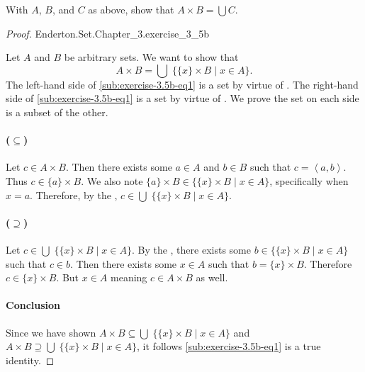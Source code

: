 \documentclass{report}
\begin{document}
With $A$, $B$, and $C$ as above, show that $A \times B = \bigcup C$.

\begin{proof}

    {Enderton.Set.Chapter\_3.exercise\_3\_5b}

  Let $A$ and $B$ be arbitrary sets.
  We want to show that
    \begin{equation}
      \label{sub:exercise-3.5b-eq1}
      A \times B = \bigcup\; \{\{x\} \times B \mid x \in A\}.
    \end{equation}
  The left-hand side of \eqref{sub:exercise-3.5b-eq1} is a set by virtue of
    .
  The right-hand side of \eqref{sub:exercise-3.5b-eq1} is a set by virtue of
    .
  We prove the set on each side is a subset of the other.

  \paragraph{($\subseteq$)}%

    Let $c \in A \times B$.
    Then there exists some $a \in A$ and $b \in B$ such that
      $c = \left< a, b \right>$.
    Thus $c \in \{a\} \times B$.
    We also note $\{a\} \times B \in \{\{x\} \times B \mid x \in A\}$,
      specifically when $x = a$.
    Therefore, by the ,
      $c \in \bigcup\;\{\{x\} \times B \mid x \in A\}$.

  \paragraph{($\supseteq$)}%

    Let $c \in \bigcup\; \{\{x\} \times B \mid x \in A\}$.
    By the , there exists some
      $b \in \{\{x\} \times B \mid x \in A\}$ such that $c \in b$.
    Then there exists some $x \in A$ such that $b = \{x\} \times B$.
    Therefore $c \in \{x\} \times B$.
    But $x \in A$ meaning $c \in A \times B$ as well.

  \paragraph{Conclusion}%

    Since we have shown
      $A \times B \subseteq \bigcup\; \{\{x\} \times B \mid x \in A\}$ and
      $A \times B \supseteq \bigcup\; \{\{x\} \times B \mid x \in A\}$, it
      follows \eqref{sub:exercise-3.5b-eq1} is a true identity.

\end{proof}
\end{document}
